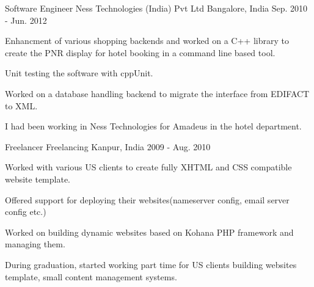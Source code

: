 \begin{cventries}
  \cventrywithsummary
    {Software Engineer} %
    {Ness Technologies (India) Pvt Ltd} %
    {Bangalore, India} %
    {Sep. 2010 - Jun. 2012} %
    {
      \begin{cvitems} %
        \item {Enhancment of various shopping backends and worked on a C++ library to create the PNR display for hotel booking in a command line based tool.}
        \item {Unit testing the software with cppUnit.}
        \item {Worked on a database handling backend to migrate the interface from EDIFACT to XML.}
      \end{cvitems}
    }
    {
      \begin{cvsummary}
        I had been working in Ness Technologies for Amadeus in the hotel department.
      \end{cvsummary}
    }

  \cventrywithsummary
    {Freelancer} %
    {Freelancing} %
    {Kanpur, India} %
    {2009 - Aug. 2010} %
    {
      \begin{cvitems} %
        \item {Worked with various US clients to create fully XHTML and CSS compatible website template.}
        \item {Offered support for deploying their websites(nameserver config, email server config etc.)}
        \item {Worked on building dynamic websites based on Kohana PHP framework and managing them.}
      \end{cvitems}
    }
    {
      \begin{cvsummary}
        During graduation, started working part time for US clients building websites template, small content management systems.
      \end{cvsummary}
    }
\end{cventries}
